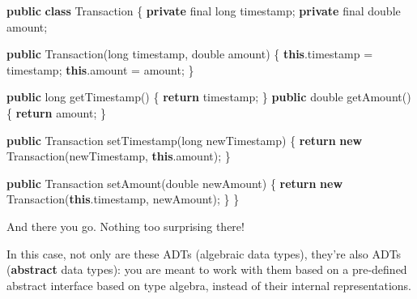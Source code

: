 \documentclass[]{article}
\newenvironment{Shaded}{}{}
\newcommand{\ControlFlowTok}[1]{\textcolor[rgb]{0.00,0.44,0.13}{\textbf{#1}}}
\newcommand{\DataTypeTok}[1]{\textcolor[rgb]{0.56,0.13,0.00}{#1}}
\newcommand{\FunctionTok}[1]{\textcolor[rgb]{0.02,0.16,0.49}{#1}}
\newcommand{\KeywordTok}[1]{\textcolor[rgb]{0.00,0.44,0.13}{\textbf{#1}}}
\newcommand{\NormalTok}[1]{#1}
\newcommand{\OperatorTok}[1]{\textcolor[rgb]{0.40,0.40,0.40}{#1}}
\begin{document}
\begin{Shaded}
\begin{Highlighting}[]
\KeywordTok{public} \KeywordTok{class}\NormalTok{ Transaction }\OperatorTok{\{}
    \KeywordTok{private} \DataTypeTok{final} \DataTypeTok{long}\NormalTok{ timestamp}\OperatorTok{;}
    \KeywordTok{private} \DataTypeTok{final} \DataTypeTok{double}\NormalTok{ amount}\OperatorTok{;}

    \KeywordTok{public} \FunctionTok{Transaction}\OperatorTok{(}\DataTypeTok{long}\NormalTok{ timestamp}\OperatorTok{,} \DataTypeTok{double}\NormalTok{ amount}\OperatorTok{)} \OperatorTok{\{}
        \KeywordTok{this}\OperatorTok{.}\FunctionTok{timestamp} \OperatorTok{=}\NormalTok{ timestamp}\OperatorTok{;}
        \KeywordTok{this}\OperatorTok{.}\FunctionTok{amount} \OperatorTok{=}\NormalTok{ amount}\OperatorTok{;}
    \OperatorTok{\}}

    \KeywordTok{public} \DataTypeTok{long} \FunctionTok{getTimestamp}\OperatorTok{()} \OperatorTok{\{} \ControlFlowTok{return}\NormalTok{ timestamp}\OperatorTok{;} \OperatorTok{\}}
    \KeywordTok{public} \DataTypeTok{double} \FunctionTok{getAmount}\OperatorTok{()} \OperatorTok{\{} \ControlFlowTok{return}\NormalTok{ amount}\OperatorTok{;} \OperatorTok{\}}

    \KeywordTok{public}\NormalTok{ Transaction }\FunctionTok{setTimestamp}\OperatorTok{(}\DataTypeTok{long}\NormalTok{ newTimestamp}\OperatorTok{)} \OperatorTok{\{}
        \ControlFlowTok{return} \KeywordTok{new} \FunctionTok{Transaction}\OperatorTok{(}\NormalTok{newTimestamp}\OperatorTok{,} \KeywordTok{this}\OperatorTok{.}\FunctionTok{amount}\OperatorTok{);}
    \OperatorTok{\}}

    \KeywordTok{public}\NormalTok{ Transaction }\FunctionTok{setAmount}\OperatorTok{(}\DataTypeTok{double}\NormalTok{ newAmount}\OperatorTok{)} \OperatorTok{\{}
        \ControlFlowTok{return} \KeywordTok{new} \FunctionTok{Transaction}\OperatorTok{(}\KeywordTok{this}\OperatorTok{.}\FunctionTok{timestamp}\OperatorTok{,}\NormalTok{ newAmount}\OperatorTok{);}
    \OperatorTok{\}}
\OperatorTok{\}}
\end{Highlighting}
\end{Shaded}

And there you go. Nothing too surprising there!

In this case, not only are these ADTs (algebraic data types), they're also ADTs
(\textbf{abstract} data types): you are meant to work with them based on a
pre-defined abstract interface based on type algebra, instead of their internal
representations.
\end{document}
